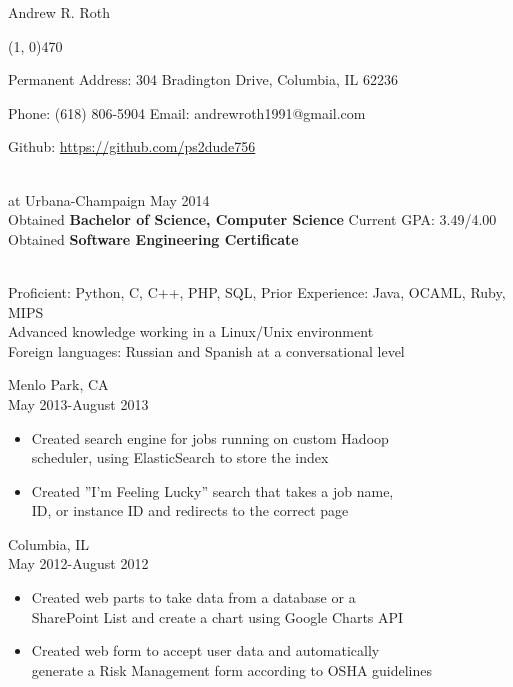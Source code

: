 \documentclass[11pt]{article}
\begin{document}
  \centerline{{\Huge \sc Andrew R. Roth}}
  \noindent\line(1, 0){470}\\
  \centerline{
    Permanent Address:
      304 Bradington Drive,
      Columbia,
      IL 62236
  }
  \centerline{
    Phone: (618) 806-5904
    \indent Email: andrewroth1991@gmail.com
  }
  \centerline{
    Github: \url{https://github.com/ps2dude756}
  }

  \bigskip

  \\
     at Urbana-Champaign \hfill 
      May 2014\\
    \indent Obtained {\bf Bachelor of Science, Computer Science} \hfill 
      Current GPA: 3.49/4.00\\
    \indent Obtained {\bf Software Engineering Certificate}\\

  \bigskip

  \\
    \indent Proficient: Python, C, C++, PHP, SQL,
      Prior Experience: Java, OCAML, Ruby, MIPS\\
    \indent Advanced knowledge working in a Linux/Unix environment\\
    \indent Foreign languages: Russian and Spanish at a conversational level

  \bigskip

    \smallskip

     \hfill Menlo Park, CA\\
     \hfill May 2013-August 2013
    \begin{itemize}[noitemsep,topsep=0pt,leftmargin=52pt]
      \item Created search engine for jobs running on custom Hadoop\\
        scheduler, using ElasticSearch to store the index
      \item Created ''I'm Feeling Lucky'' search that takes a job name,\\
        ID, or instance ID and redirects to the correct page
    \end{itemize}
    \medskip

     \hfill Columbia, IL\\
     \hfill May 2012-August 2012
    \begin{itemize}[noitemsep,topsep=0pt,leftmargin=52pt]
      \item Created web parts to take data from a database or a\\
        SharePoint List and create a chart using Google Charts API
      \item Created web form to accept user data and automatically\\
        generate a Risk Management form according to OSHA guidelines
    \end{itemize}
    \medskip
\end{document}
